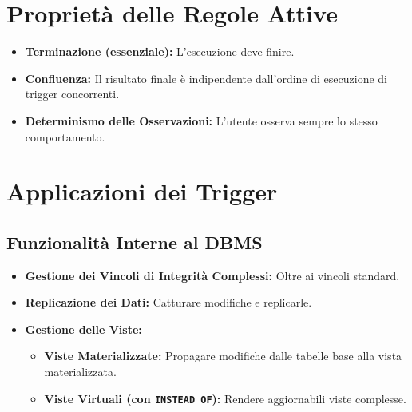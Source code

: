 	\section{Proprietà delle Regole Attive}
	\begin{itemize}
		\item \textbf{Terminazione (essenziale):} L'esecuzione deve finire.
		\item \textbf{Confluenza:} Il risultato finale è indipendente dall'ordine di esecuzione di trigger concorrenti.
		\item \textbf{Determinismo delle Osservazioni:} L'utente osserva sempre lo stesso comportamento.
	\end{itemize}
	
	\section{Applicazioni dei Trigger}
	\subsection{Funzionalità Interne al DBMS}
	\begin{itemize}
		\item \textbf{Gestione dei Vincoli di Integrità Complessi:} Oltre ai vincoli standard.
		\item \textbf{Replicazione dei Dati:} Catturare modifiche e replicarle.
		\item \textbf{Gestione delle Viste:}
		\begin{itemize}
			\item \textbf{Viste Materializzate:} Propagare modifiche dalle tabelle base alla vista materializzata.
			\item \textbf{Viste Virtuali (con \texttt{INSTEAD OF}):} Rendere aggiornabili viste complesse.
		\end{itemize}
	\end{itemize}
	
